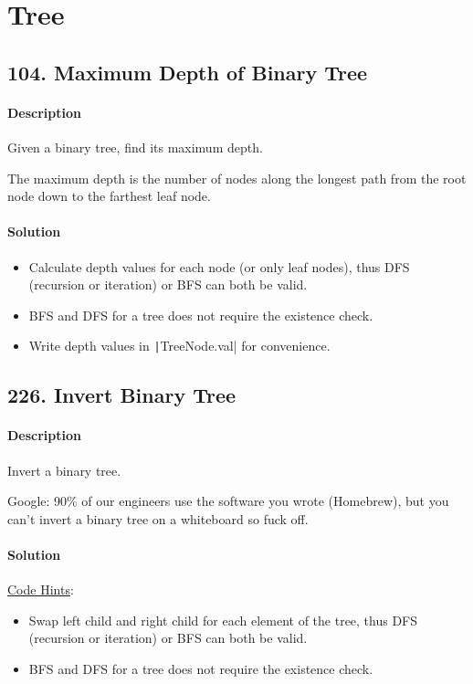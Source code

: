 \section{Tree}

\subsection{104. Maximum Depth of Binary Tree}

\paragraph{Description}

Given a binary tree, find its maximum depth.

The maximum depth is the number of nodes along the longest path from the root node down to the farthest leaf node.

\paragraph{Solution}

\begin{itemize}
    \item Calculate depth values for each node (or only leaf nodes), thus DFS (recursion or iteration) or BFS can both be valid.
    \item BFS and DFS for a tree does not require the existence check.
    \item Write depth values in \texttt|TreeNode.val| for convenience.
\end{itemize}

\subsection{226. Invert Binary Tree}

\paragraph{Description}

Invert a binary tree.

Google: 90\% of our engineers use the software you wrote (Homebrew), but you can’t invert a binary tree on a whiteboard so fuck off.

\paragraph{Solution}

\underline{Code Hints}:
\begin{itemize}
    \item Swap left child and right child for each element of the tree, thus DFS (recursion or iteration) or BFS can both be valid.
    \item BFS and DFS for a tree does not require the existence check.
\end{itemize}